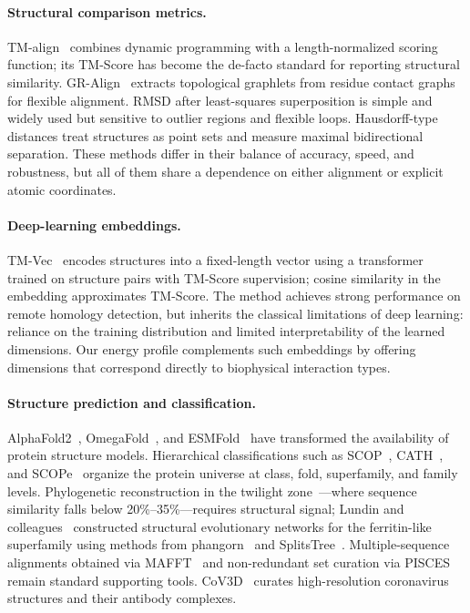 \documentclass[11pt]{article}
\begin{document}
\paragraph{Structural comparison metrics.}
TM-align~\citep{zhang2005tmalign} combines dynamic programming with a
length-normalized scoring function; its TM-Score has become the de-facto
standard for reporting structural similarity. GR-Align~\citep{maloddognin2014gralign}
extracts topological graphlets from residue contact graphs for flexible
alignment. RMSD after least-squares superposition is simple and widely used
but sensitive to outlier regions and flexible loops. Hausdorff-type distances
treat structures as point sets and measure maximal bidirectional separation.
These methods differ in their balance of accuracy, speed, and robustness, but
all of them share a dependence on either alignment or explicit atomic
coordinates.

\paragraph{Deep-learning embeddings.}
TM-Vec~\citep{hamamsy2024tmvec} encodes structures into a fixed-length vector
using a transformer trained on structure pairs with TM-Score supervision;
cosine similarity in the embedding approximates TM-Score. The method achieves
strong performance on remote homology detection, but inherits the classical
limitations of deep learning: reliance on the training distribution and
limited interpretability of the learned dimensions. Our energy profile
complements such embeddings by offering dimensions that correspond directly to
biophysical interaction types.

\paragraph{Structure prediction and classification.}
AlphaFold2~\citep{jumper2021alphafold}, OmegaFold~\citep{wu2022omegafold}, and
ESMFold~\citep{lin2023esmfold} have transformed the availability of protein
structure models. Hierarchical classifications such as
SCOP~\citep{murzin1995scop}, CATH~\citep{orengo1997cath}, and
SCOPe~\citep{chandonia2019scope} organize the protein universe at class, fold,
superfamily, and family levels. Phylogenetic reconstruction in the
twilight zone~\citep{chothia1986twilight}---where sequence similarity falls
below 20\%--35\%---requires structural signal; Lundin and
colleagues~\citep{lundin2012ferritin} constructed structural evolutionary
networks for the ferritin-like superfamily using methods from
phangorn~\citep{schliep2011phangorn} and SplitsTree~\citep{huson2024splitstree}.
Multiple-sequence alignments obtained via MAFFT~\citep{rozewicki2021mafft} and
non-redundant set curation via PISCES~\citep{wang2003pisces} remain standard
supporting tools. CoV3D~\citep{gowthaman2021cov3d} curates high-resolution
coronavirus structures and their antibody complexes.
\end{document}
